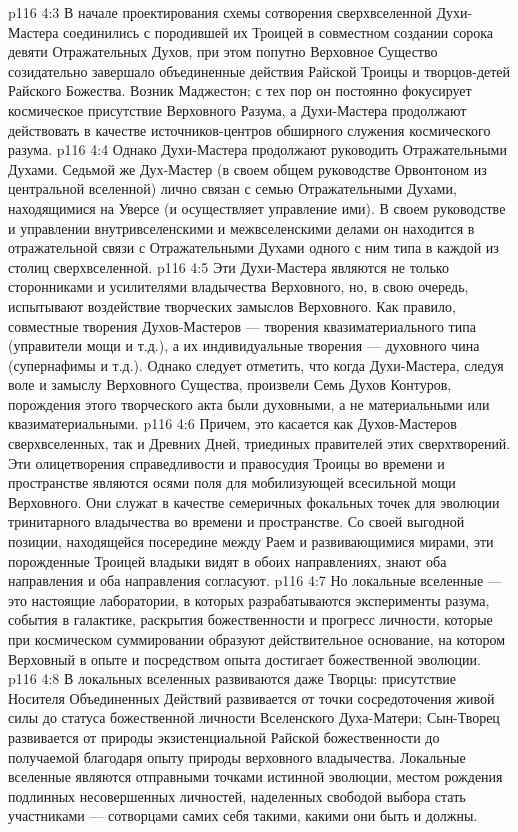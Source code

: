 \vs p116 4:3 В начале проектирования схемы сотворения сверхвселенной Духи\hyp{}Мастера соединились с породившей их Троицей в совместном создании сорока девяти Отражательных Духов, при этом попутно Верховное Существо созидательно завершало объединенные действия Райской Троицы и творцов\hyp{}детей Райского Божества. Возник Маджестон; с тех пор он постоянно фокусирует космическое присутствие Верховного Разума, а Духи\hyp{}Мастера продолжают действовать в качестве источников\hyp{}центров обширного служения космического разума.
\vs p116 4:4 Однако Духи\hyp{}Мастера продолжают руководить Отражательными Духами. Седьмой же Дух\hyp{}Мастер (в своем общем руководстве Орвонтоном из центральной вселенной) лично связан с семью Отражательными Духами, находящимися на Уверсе (и осуществляет управление ими). В своем руководстве и управлении внутривселенскими и межвселенскими делами он находится в отражательной связи с Отражательными Духами одного с ним типа в каждой из столиц сверхвселенной.
\vs p116 4:5 Эти Духи\hyp{}Мастера являются не только сторонниками и усилителями владычества Верховного, но, в свою очередь, испытывают воздействие творческих замыслов Верховного. Как правило, совместные творения Духов\hyp{}Мастеров --- творения квазиматериального типа (управители мощи и т.д.), а их индивидуальные творения --- духовного чина (супернафимы и т.д.). Однако следует отметить, что когда Духи\hyp{}Мастера, следуя воле и замыслу Верховного Существа,  произвели Семь Духов Контуров, порождения этого творческого акта были духовными, а не материальными или квазиматериальными.
\vs p116 4:6 \pc Причем, это касается как Духов\hyp{}Мастеров сверхвселенных, так и Древних Дней, триединых правителей этих сверхтворений. Эти олицетворения справедливости и правосудия Троицы во времени и пространстве являются осями поля для мобилизующей всесильной мощи Верховного. Они служат в качестве семеричных фокальных точек для эволюции тринитарного владычества во времени и пространстве. Со своей выгодной позиции, находящейся посередине между Раем и развивающимися мирами, эти порожденные Троицей владыки видят в обоих направлениях, знают оба направления и оба направления согласуют.
\vs p116 4:7 \pc Но локальные вселенные --- это настоящие лаборатории, в которых разрабатываются эксперименты разума, события в галактике, раскрытия божественности и прогресс личности, которые при космическом суммировании образуют действительное основание, на котором Верховный в опыте и посредством опыта достигает божественной эволюции.
\vs p116 4:8 В локальных вселенных развиваются даже Творцы: присутствие Носителя Объединенных Действий развивается от точки сосредоточения живой силы до статуса божественной личности Вселенского Духа\hyp{}Матери; Сын\hyp{}Творец развивается от природы экзистенциальной Райской божественности до получаемой благодаря опыту природы верховного владычества. Локальные вселенные являются отправными точками истинной эволюции, местом рождения подлинных несовершенных личностей, наделенных свободой выбора стать участниками --- сотворцами самих себя такими, какими они быть и должны.
